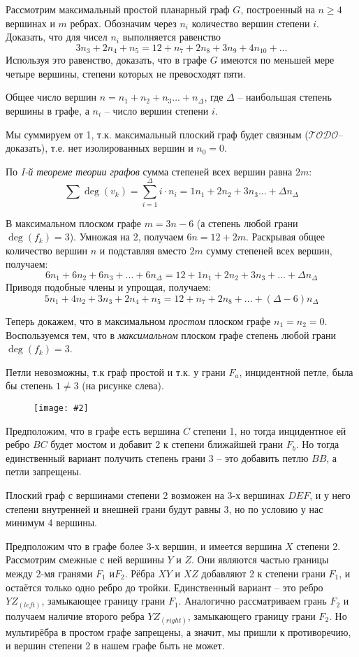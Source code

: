 \documentclass[a4paper,12pt]{article}
\numberwithin{figure}{section}
\def\TODO{\guillemotleft$\mathcal{TODO}$\guillemotright\textellipsis}
\newcommand\CenterFigure[2]{
	\begin{figure}[H]
		\centering
		\texttt{[image: \#2]}
	\end{figure}
}
\begin{document}
\begin{problem}
	Рассмотрим максимальный простой планарный граф $G$, построенный на $n \geqslant 4$ вершинах и $m$ ребрах. Обозначим через $n_i$ количество вершин степени $i$. Доказать, что для чисел $n_i$ выполняется равенство
	\[ 3n_3+2n_4+n_5=12+n_7+2n_8+3n_9+4n_{10}+... \]
	Используя это равенство, доказать, что в графе $G$ имеются по меньшей мере четыре вершины, степени которых не превосходят пяти.
\end{problem}
\begin{solution}
	Общее число вершин
	$\displaystyle n=n_1+n_2+n_3...+n_{\Delta}$,
	где $\Delta$ -- наибольшая степень вершины в графе, а $n_i$ -- число вершин степени $i$.
	
	Мы суммируем от 1, т.к. максимальный плоский граф будет связным (\TODO -- доказать), т.е. нет изолированных вершин и $n_0=0$.
	
	По \textit{I-й теореме теории графов} сумма степеней всех вершин равна $2m$: \[ \sum{\deg(v_k)}=\sum_{i=1}^{\Delta}{i \cdot n_i}=1n_1+2n_2+3n_3...+\Delta n_{\Delta} \]
	
	В максимальном плоском графе $m=3n-6$ (а степень любой грани $\deg(f_k)=3$).
	Умножая на 2, получаем $6n=12+2m$.
	Раскрывая общее количество вершин $n$ и подставляя вместо $2m$ сумму степеней всех вершин, получаем:
	\[ 6n_1+6n_2+6n_3+...+6n_{\Delta} = 12+1n_1+2n_2+3n_3+...+\Delta n_{\Delta}\]
	Приводя подобные члены и упрощая, получаем:
	\[ 5n_1+4n_2+3n_3+2n_4+n_5 = 12+n_7+2n_8+...+(\Delta-6)n_{\Delta} \]

	Теперь докажем, что в максимальном \textit{простом} плоском графе $n_1=n_2=0$. Воспользуемся тем, что в \textit{максимальном} плоском графе степень любой грани $\deg(f_k)=3$.

	Петли невозможны, т.к граф простой и т.к. у грани $F_a$, инцидентной петле, была бы степень $1 \neq 3$ (на рисунке слева).
		\CenterFigure{9cm}{max-simple-flat-graph-cannot-have-deg-1-or-2.png}
	Предположим, что в графе есть вершина $C$ степени 1, но тогда инцидентное ей ребро $BC$ будет мостом и добавит 2 к степени ближайшей грани $F_b$. Но тогда единственный вариант получить степень грани 3 -- это добавить петлю $BB$, а петли запрещены.
	
	Плоский граф с вершинами степени 2 возможен на 3-х вершинах $DEF$, и у него степени внутренней и внешней грани будут равны 3, но по условию у нас минимум 4 вершины.
	
	Предположим что в графе более 3-х вершин, и имеется вершина $X$ степени 2. Рассмотрим смежные с ней вершины $Y$ и $Z$. Они являются частью границы между 2-мя гранями $F_1$ и$F_2$. Рёбра $XY$ и $XZ$ добавляют 2 к степени грани $F_1$, и остаётся только одно ребро до тройки. Единственный вариант -- это ребро $YZ_{(left)}$, замыкающее границу грани $F_1$. Аналогично рассматриваем грань $F_2$ и получаем наличие второго ребра $YZ_{(right)}$, замыкающего границу грани $F_2$. Но мультирёбра в простом графе запрещены, а значит, мы пришли к противоречию, и вершин степени 2 в нашем графе быть не может.


\end{solution}
\end{document}
